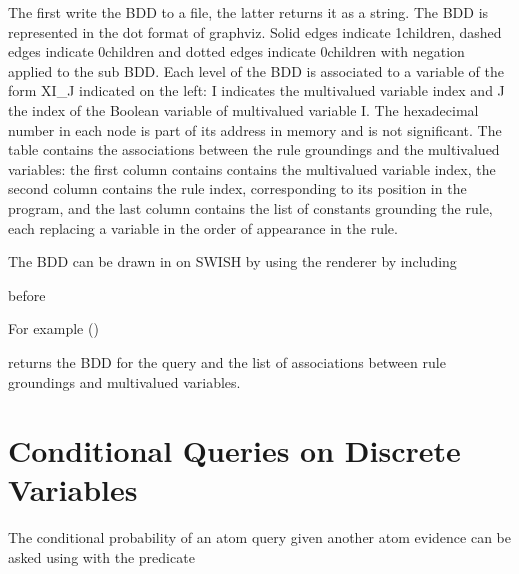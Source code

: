 \documentclass[letterpaper,10pt,english]{sphinxmanual}
\begin{document}
\sphinxAtStartPar
The first write the BDD to a file, the latter returns it as a string.
The BDD is represented in the dot format of graphviz.
Solid edges indicate 1\sphinxhyphen{}children, dashed edges indicate 0\sphinxhyphen{}children and dotted edges indicate 0\sphinxhyphen{}children
with negation applied to the sub BDD.
Each level of the BDD is associated to a variable of the form XI\_J indicated on the left: I indicates the multivalued variable index and J the index of the Boolean variable of multivalued variable I.
The hexadecimal number in each node is part of its address in memory and is not significant.
The table  contains the associations between the rule groundings and the multivalued variables: the first column contains contains the multivalued variable index, the second column contains the rule index, corresponding to its position in the program, and the last column contains the list of constants grounding the rule, each replacing a variable in the order of appearance in the rule.

\sphinxAtStartPar
The BDD can be drawn in  on SWISH by using the  renderer by including

\begin{sphinxVerbatim}[commandchars=\\\{\}]
 
\end{sphinxVerbatim}

\sphinxAtStartPar
before 

\sphinxAtStartPar
For example ()

\begin{sphinxVerbatim}[commandchars=\\\{\}]
 
\end{sphinxVerbatim}

\sphinxAtStartPar
returns the BDD for the query  and the list of associations between rule groundings
and multivalued variables.


\section{Conditional Queries on Discrete Variables}
\label{\detokenize{index:conditional-queries-on-discrete-variables}}
\sphinxAtStartPar
The conditional probability of an atom query given another atom evidence can be asked using 
with the predicate
\end{document}
